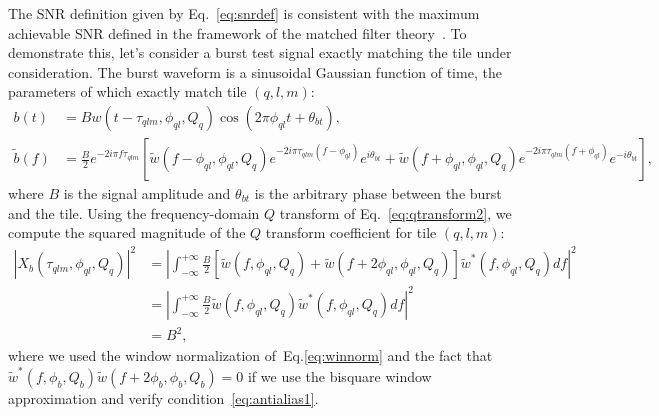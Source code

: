 The SNR definition given by Eq.~\ref{eq:snrdef} is consistent with the maximum achievable SNR defined in the framework of the matched filter theory~\cite{helstrom:1968}. To demonstrate this, let's consider a burst test signal exactly matching the tile under consideration. The burst waveform is a sinusoidal Gaussian function of time, the parameters of which exactly match tile $(q,l,m)$:
\begin{align}
  b(t) &= Bw(t-\tau_{qlm}, \phi_{ql}, Q_q)\cos(2\pi\phi_{ql} t + \theta_{bt}),\\
  \tilde{b}(f) &= \frac{B}{2}e^{-2i\pi f\tau_{qlm}}\left[ \tilde{w}(f-\phi_{ql},\phi_{ql},Q_q)e^{-2i\pi\tau_{qlm}(f-\phi_{ql})}e^{i\theta_{bt}}+\tilde{w}(f+\phi_{ql},\phi_{ql},Q_q)e^{-2i\pi\tau_{qlm}(f+\phi_{ql})}e^{-i\theta_{bt}}\right],
\end{align}
where $B$ is the signal amplitude and $\theta_{bt}$ is the arbitrary phase between the burst and the tile. Using the frequency-domain $Q$ transform of Eq.~\ref{eq:qtransform2}, we compute the squared magnitude of the $Q$ transform coefficient for tile $(q,l,m)$:
\begin{align}
  |X_b(\tau_{qlm}, \phi_{ql}, Q_q)|^2 &= \left|\int_{-\infty}^{+\infty}{ \frac{B}{2}\left[ \tilde{w}(f,\phi_{ql},Q_q)+\tilde{w}(f+2\phi_{ql},\phi_{ql},Q_q)\right] \tilde{w}^{*}(f,\phi_{ql},Q_q) df} \right|^2\\
  &= \left|\int_{-\infty}^{+\infty}{ \frac{B}{2} \tilde{w}(f,\phi_{ql},Q_q) \tilde{w}^{*}(f,\phi_{ql},Q_q) df}\right|^2 \\
  &= B^2,
  \label{eq:qtransform_signal}
\end{align}
where we used the window normalization of~Eq.\ref{eq:winnorm} and the fact that $\tilde{w}^{*}(f,\phi_b,Q_b)\tilde{w}(f+2\phi_b,\phi_b,Q_b)=0$ if we use the bisquare window approximation and verify condition~\ref{eq:antialias1}.

